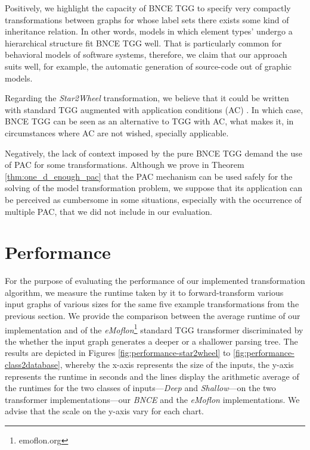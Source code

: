 Positively, we highlight the capacity of BNCE TGG to specify very compactly transformations between graphs for whose label sets there exists some kind of inheritance relation. In other words, models in which element types' undergo a hierarchical structure fit BNCE TGG well. That is particularly common for behavioral models of software systems, therefore, we claim that our approach suits well, for example, the automatic generation of source-code out of graphic models.

Regarding the \emph{Star2Wheel} transformation, we believe that it could be written with standard TGG augmented with application conditions (AC) \cite{ehrig2009completeness}. In which case, BNCE TGG can be seen as an alternative to TGG with AC, what makes it, in circumstances where AC are not wished, specially applicable.

Negatively, the lack of context imposed by the pure BNCE TGG demand the use of PAC for some transformations. Although we prove in Theorem \ref{thm:one_d_enough_pac} that the PAC mechanism can be used safely for the solving of the model transformation problem, we suppose that its application can be perceived as cumbersome in some situations, especially with the occurrence of multiple PAC, that we did not include in our evaluation.

\section{Performance}
\label{sec:eval-performance}
For the purpose of evaluating the performance of our implemented transformation algorithm, we measure the runtime taken by it to forward-transform various input graphs of various sizes for the same five example transformations from the previous section. We provide the comparison between the average runtime of our implementation and of the \emph{eMoflon}\footnote{emoflon.org} standard TGG transformer \cite{leblebici2014developing} discriminated by the whether the input graph generates a deeper or a shallower parsing tree. The results are depicted in Figures \ref{fig:performance-star2wheel} to \ref{fig:performance-class2database}, whereby the x-axis represents the size of the inputs, the y-axis represents the runtime in seconds and the lines display the arithmetic average of the runtimes for the two classes of inputs---\emph{Deep} and \emph{Shallow}---on the two transformer implementations---our \emph{BNCE} and the \emph{eMoflon} implementations. We advise that the scale on the y-axis vary for each chart.

